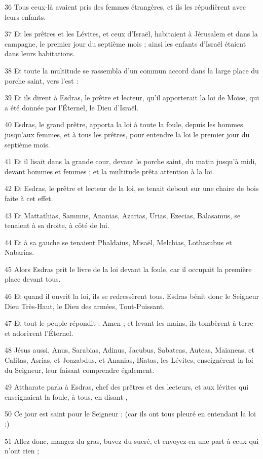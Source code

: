 \par 36 Tous ceux-là avaient pris des femmes étrangères, et ils les répudièrent avec leurs enfants.
\par 37 Et les prêtres et les Lévites, et ceux d'Israël, habitaient à Jérusalem et dans la campagne, le premier jour du septième mois ; ainsi les enfants d'Israël étaient dans leurs habitations.
\par 38 Et toute la multitude se rassembla d'un commun accord dans la large place du porche saint, vers l'est :
\par 39 Et ils dirent à Esdras, le prêtre et lecteur, qu'il apporterait la loi de Moïse, qui a été donnée par l'Éternel, le Dieu d'Israël.
\par 40 Esdras, le grand prêtre, apporta la loi à toute la foule, depuis les hommes jusqu'aux femmes, et à tous les prêtres, pour entendre la loi le premier jour du septième mois.
\par 41 Et il lisait dans la grande cour, devant le porche saint, du matin jusqu'à midi, devant hommes et femmes ; et la multitude prêta attention à la loi.
\par 42 Et Esdras, le prêtre et lecteur de la loi, se tenait debout sur une chaire de bois faite à cet effet.
\par 43 Et Mattathias, Sammus, Ananias, Azarias, Urias, Ezecias, Balasamus, se tenaient à sa droite, à côté de lui.
\par 44 Et à sa gauche se tenaient Phaldaius, Misaël, Melchias, Lothasubus et Nabarias.
\par 45 Alors Esdras prit le livre de la loi devant la foule, car il occupait la première place devant tous.
\par 46 Et quand il ouvrit la loi, ils se redressèrent tous. Esdras bénit donc le Seigneur Dieu Très-Haut, le Dieu des armées, Tout-Puissant.
\par 47 Et tout le peuple répondit : Amen ; et levant les mains, ils tombèrent à terre et adorèrent l'Éternel.
\par 48 Jésus aussi, Anus, Sarabias, Adinus, Jacubus, Sabateas, Auteas, Maianeas, et Calitas, Asrias, et Joazabdus, et Ananias, Biatas, les Lévites, enseignèrent la loi du Seigneur, leur faisant comprendre également.
\par 49 Attharate parla à Esdras, chef des prêtres et des lecteurs, et aux lévites qui enseignaient la foule, à tous, en disant ,
\par 50 Ce jour est saint pour le Seigneur ; (car ils ont tous pleuré en entendant la loi :)
\par 51 Allez donc, mangez du gras, buvez du sucré, et envoyez-en une part à ceux qui n'ont rien ;
